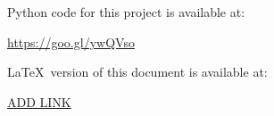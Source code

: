 Python code for this project is available at:

\url{https://goo.gl/ywQVso}

\vspace{1cm}


\LaTeX\ version of this document is available at:

\url{ADD LINK}

\vspace{1cm}